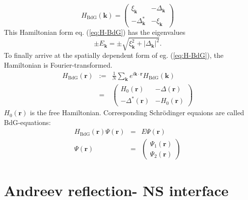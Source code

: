\begin{equation}
H_\text{BdG}\left(\mathbf{k} \right) = \begin{pmatrix}
\xi_\mathbf{k} &  - \Delta_\mathbf{k}\\
- \Delta^*_\mathbf{k} & - \xi_\mathbf{k}
\end{pmatrix} \label{eq:H-BdG}
\end{equation}
This Hamiltonian form eq. (\ref{eq:H-BdG}) has the eigenvalues
\begin{equation}
 \pm E_\mathbf{k} = \pm \sqrt{\xi_\mathbf{k}^2 + |\Delta_\mathbf{k}|^2  }.
\end{equation}
To finally arrive at the spatially dependent form of eg. (\ref{eq:H-BdG}), the Hamiltonian is Fourier-transformed.
\begin{eqnarray}
H_\text{BdG} \left( \mathbf{r} \right) &:=& \frac{1}{N} \sum_\mathbf{k} e^{i \mathbf{k \cdot r}} H_\text{BdG}\left( \mathbf{k} \right) \\
&=& \begin{pmatrix}
H_0\left( \mathbf{r} \right)  &  - \Delta \left( \mathbf{r} \right) \\
- \Delta^* \left( \mathbf{r} \right)  & - H_0 \left( \mathbf{r} \right) 
\end{pmatrix} \label{eq:H-BdG-r}
\end{eqnarray}
$H_0 \left( \mathbf{r} \right) $ is the free Hamiltonian. Corresponding Schr\"odinger equaions are called BdG-equations:
\begin{eqnarray}
H_\text{BdG} \left( \mathbf{r} \right) \Psi\left( \mathbf{r} \right) &=& E \Psi\left( \mathbf{r} \right)\label{eq:BdG-eq} \\
\Psi\left( \mathbf{r} \right)  &=& \begin{pmatrix}
\Psi_1\left( \mathbf{r} \right) \\ \Psi_2\left( \mathbf{r} \right) 
\end{pmatrix}\label{eq:BdG-spinor}
\end{eqnarray}

\section{Andreev reflection- NS interface}\label{sec:NS}

